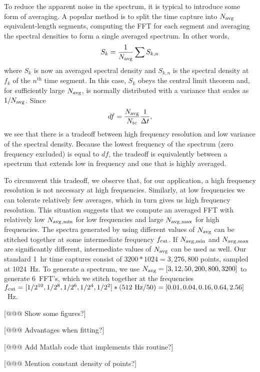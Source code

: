 To reduce the apparent noise in the spectrum, it is typical to introduce some form of averaging. A popular method is to split the time capture into $N_\text{avg}{}$ equivalent-length segments, computing the FFT for each segment and averaging the spectral densities to form a single averaged spectrum. In other words,
\begin{align}\label{eqn:Sk_averaged_def}
S_k = \frac{1}{N_\text{avg}{}} \sum S_{k,n}
\end{align}
where $S_k$ is now an averaged spectral density and $S_{k,n}$ is the spectral density at $f_k$ of the $n^\text{th}$ time segment. In this case, $S_k$ obeys the central limit theorem and, for sufficiently large $N_\text{avg}{}$, is normally distributed with a variance that scales as $1/N_\text{avg}{}$. Since
\begin{align}\label{eqn:df_Navg_def}
df = \frac{N_\text{avg}{}}{N_\text{tc}}\frac{1}{\Delta t},
\end{align}
we see that there is a tradeoff between high frequency resolution and low variance of the spectral density. Because the lowest frequency of the spectrum (zero frequency excluded) is equal to $df$, the tradeoff is equivalently between a spectrum that extends low in frequency and one that is highly averaged.

To circumvent this tradeoff, we observe that, for our application, a high frequency resolution is not necessary at high frequencies. Similarly, at low frequencies we can tolerate relatively few averages, which in turn gives us high frequency resolution. This situation suggests that we compute an averaged FFT with relatively low $N_\text{avg}{}_\text{,min}$ for low frequencies and large $N_\text{avg}{}_\text{,max}$ for high frequencies. The spectra generated by using different values of $N_\text{avg}{}$ can be stitched together at some intermediate frequency $f_\text{cut}{}$. If $N_\text{avg}{}_\text{,min}$ and $N_\text{avg}{}_\text{,max}$ are significantly different, intermediate values of $N_\text{avg}{}$ can be used as well. Our standard 1~hr time captures consist of $3200*1024 = 3,276,800$ points, sampled at 1024~Hz. To generate a spectrum, we use $N_\text{avg}{} = [3, 12, 50, 200, 800, 3200]$ to generate 6~FFT's, which we stitch together at the frequencies $f_\text{cut}{} = [1/2^{10}, 1/2^8, 1/2^6, 1/2^4, 1/2^2]*(512~\text{Hz}/50) = [0.01, 0.04, 0.16, 0.64, 2.56]$~Hz.

[@@@ Show some figures?]

[@@@ Advantages when fitting?]

[@@@ Add Matlab code that implements this routine?] 

[@@@ Mention constant density of points?]